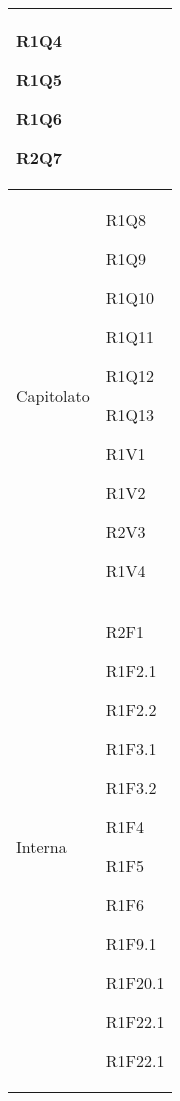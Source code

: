 \begin{center}
\begin{longtable}{|p{44mm}|p{22mm}|}
R1Q4 \newline

R1Q5 \newline

R1Q6 \newline

R2Q7 \newline
\\
\hline
Capitolato &

R1Q8 \newline

R1Q9 \newline

R1Q10 \newline

R1Q11 \newline

R1Q12 \newline

R1Q13 \newline

R1V1 \newline

R1V2 \newline

R2V3 \newline

R1V4 \newline
\\
\hline
Interna &

R2F1 \newline

R1F2.1 \newline

R1F2.2 \newline

R1F3.1 \newline

R1F3.2 \newline

R1F4 \newline

R1F5 \newline

R1F6 \newline

R1F9.1 \newline

R1F20.1 \newline

R1F22.1 \newline

R1F22.1 \newline


\end{longtable}
\end{center}
